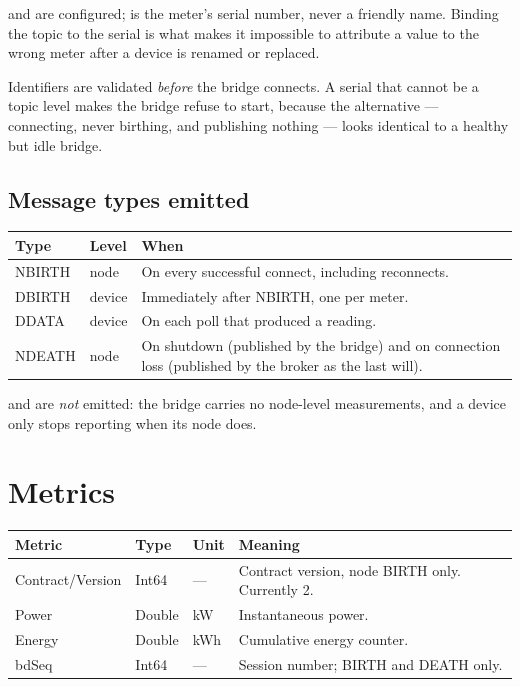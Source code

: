  and  are configured;  is the meter's serial number,
never a friendly name. Binding the topic to the serial is what makes it impossible to
attribute a value to the wrong meter after a device is renamed or replaced.

Identifiers are validated \emph{before} the bridge connects. A serial that cannot be a
topic level makes the bridge refuse to start, because the alternative — connecting,
never birthing, and publishing nothing — looks identical to a healthy but idle bridge.

\subsection{Message types emitted}

\begin{center}
\begin{tabular}{@{}>{\ttfamily}l l p{7.4cm}@{}}
\toprule
\normalfont\textbf{Type} & \textbf{Level} & \textbf{When} \\
\midrule
NBIRTH & node   & On every successful connect, including reconnects. \\
DBIRTH & device & Immediately after NBIRTH, one per meter. \\
DDATA  & device & On each poll that produced a reading. \\
NDEATH & node   & On shutdown (published by the bridge) and on connection loss
                  (published by the broker as the last will). \\
\bottomrule
\end{tabular}
\end{center}

 and  are \emph{not} emitted: the bridge carries no node-level
measurements, and a device only stops reporting when its node does.

\section{Metrics}

\begin{center}
\begin{tabular}{@{}>{\ttfamily}l l l p{5.2cm}@{}}
\toprule
\normalfont\textbf{Metric} & \textbf{Type} & \textbf{Unit} & \textbf{Meaning} \\
\midrule
Contract/Version & Int64  & ---   & Contract version, node BIRTH only. Currently 2. \\
Power            & Double & kW    & Instantaneous power. \\
Energy           & Double & kWh   & Cumulative energy counter. \\
bdSeq            & Int64  & ---   & Session number; BIRTH and DEATH only. \\
\bottomrule
\end{tabular}
\end{center}

